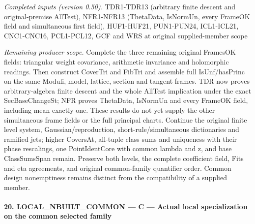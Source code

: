 \emph{Completed inputs (version 0.50).} TDR1-TDR13 (arbitrary finite descent and original-premise AllTest), NFR1-NFR13 (ThetaData, IsNormUn, every FrameOK field and simultaneous first field), HUF1-HUF21, PUN1-PUN24, ICL1-ICL21, CNC1-CNC16, PCL1-PCL12, GCF and WRS at original supplied-member scope

\emph{Remaining producer scope.} Complete the three remaining original FramesOK fields: triangular weight covariance, arithmetic invariance and holomorphic readings. Then construct CoverTri and FibTri and assemble full IsUnf/hasPrinc on the same Moduli, model, lattice, section and tangent frames. TDR now proves arbitrary-algebra finite descent and the whole AllTest implication under the exact SecBaseChangeSt; NFR proves ThetaData, IsNormUn and every FrameOK field, including mean exactly one. These results do not yet supply the other simultaneous frame fields or the full principal charts. Continue the original finite level system, Gaussian/reproduction, short-rule/simultaneous dictionaries and ramified jets; higher CoversAt, all-tuple class sums and uniqueness with their phase rescalings, one PointIdentCore with common lambda and z, and base ClassSumsSpan remain. Preserve both levels, the complete coefficient field, Fits and eta agreements, and original common-family quantifier order. Common design nonemptiness remains distinct from the compatibility of a supplied member.



\paragraph{20. LOCAL\_\allowbreak NBUILT\_\allowbreak COMMON — C — Actual local specialization on the common selected family}

